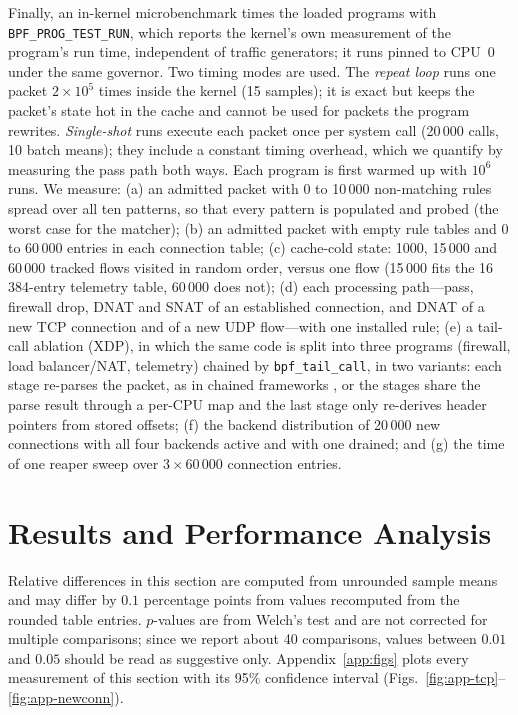 \documentclass[conference]{IEEEtran}
\begin{document}
Finally, an in-kernel microbenchmark times the loaded programs with
\texttt{BPF\_PROG\_TEST\_RUN}, which reports the kernel's own measurement of
the program's run time, independent of traffic generators; it runs pinned to
CPU~0 under the same governor. Two timing modes are used. The \emph{repeat
loop} runs one packet $2\times10^5$ times inside the kernel (15 samples); it
is exact but keeps the packet's state hot in the cache and cannot be used for
packets the program rewrites. \emph{Single-shot} runs execute each packet once
per system call (20\,000 calls, 10 batch means); they include a constant
timing overhead, which we quantify by measuring the pass path both ways. Each
program is first warmed up with $10^6$ runs. We
measure: (a) an admitted packet with 0 to 10\,000 non-matching rules spread
over all ten patterns, so that every pattern is populated and probed (the
worst case for the matcher); (b) an admitted packet with empty rule tables
and 0 to 60\,000 entries in each connection table; (c) cache-cold state: 1000, 15\,000 and 60\,000 tracked
flows visited in random order, versus one flow (15\,000 fits the
16\,384-entry telemetry table, 60\,000 does not); (d) each processing
path---pass, firewall drop, DNAT and SNAT of an established connection, and
DNAT of a new TCP connection and of a new UDP flow---with one installed rule;
(e) a tail-call ablation (XDP), in which the same code is split into three
programs (firewall, load balancer/NAT, telemetry) chained by
\texttt{bpf\_tail\_call}, in two variants: each stage re-parses the packet,
as in chained frameworks \cite{miano2021polycube}, or the stages share the
parse result through a per-CPU map and the last stage only re-derives header
pointers from stored offsets; (f) the
backend distribution of 20\,000 new connections with all four backends
active and with one drained; and (g) the time of one reaper sweep over
$3\times60\,000$ connection entries.

\section{Results and Performance Analysis}
\label{sec:results}
Relative differences in this section are computed from unrounded sample
means and may differ by $0.1$ percentage points from values recomputed from
the rounded table entries. $p$-values are from Welch's test and are not
corrected for multiple comparisons; since we report about 40 comparisons,
values between $0.01$ and $0.05$ should be read as suggestive only.
Appendix~\ref{app:figs} plots every measurement of this section with its
95\% confidence interval (Figs.~\ref{fig:app-tcp}--\ref{fig:app-newconn}).
\end{document}

